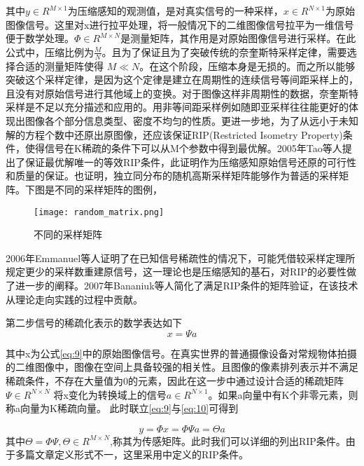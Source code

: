 其中$y \in R^{M \times 1}$为压缩感知的观测值，是对真实信号的一种采样，$x \in R^{N \times 1}$为原始图像信号。这里对x进行拉平处理，将一般情况下的二维图像信号拉平为一维信号便于数学处理。$\Phi \in R^{M \times N}$是测量矩阵，其作用是对原始图像信号进行采样。在此公式中，压缩比例为$\frac{M}{N}$。且为了保证且为了突破传统的奈奎斯特采样定律，需要选择合适的测量矩阵使得 $M \ll N$。在这个阶段，压缩本身是无损的。而之所以能够突破这个采样定律，是因为这个定律是建立在周期性的连续信号等间距采样上的，且没有对原始信号进行其他域上的变换。对于图像这样非周期性的数据，奈奎斯特采样是不足以充分描述和应用的。用非等间距采样例如随即亚采样往往能更好的体现出图像各个部分信息类型、密度不均匀的性质。更进一步地，为了从远小于未知解的方程个数中还原出原图像，还应该保证RIP(Restricted Isometry Property)条件，使得信号在K稀疏的条件下可以从M个参数中得到最优解。2005年Tao等人\cite{Decoding_by_linear_programming}提出了保证最优解唯一的等效RIP条件，此证明作为压缩感知原始信号还原的可行性和质量的保证。也证明，独立同分布的随机高斯采样矩阵能够作为普适的采样矩阵。下图是不同的采样矩阵的图例，

\begin{figure}[ht]
  \centering
  \texttt{[image: random\_matrix.png]}
  \label{fig:random_sample_matrix}
  \caption{不同的采样矩阵}
\end{figure}

2006年Emmanuel等人\cite{Emmanuel2006Stable}证明了在已知信号稀疏性的情况下，可能凭借较采样定理所规定更少的采样数重建原信号，这一理论也是压缩感知的基石，对RIP的必要性做了进一步的阐释。2007年Bananiuk等人\cite{2008A}简化了满足RIP条件的矩阵验证，在该技术从理论走向实践的过程中贡献。


第二步信号的稀疏化表示的数学表达如下
\begin{equation}
  \label{eq:10}
  x = \Psi a
\end{equation}

其中x为公式\ref{eq:9}中的原始图像信号。在真实世界的普通摄像设备对常规物体拍摄的二维图像中，图像在空间上具备较强的相关性。且图像的像素排列表示并不满足稀疏条件，不存在大量值为0的元素，因此在这一步中通过设计合适的稀疏矩阵$\Psi \in R^{N \times N}$
将x变化为转换域上的信号$a \in R^{N \times 1}$。如果a向量中有K个非零元素，则称a向量为K稀疏向量。
此时联立\ref{eq:9}与\ref{eq:10}可得到

\begin{equation}
  \label{eq:14}
   y = \Phi x = \Phi \Psi a = \Theta a
\end{equation}
其中$\Theta = \Phi \Psi, \Theta \in R^{M \times N}$,称其为传感矩阵。此时我们可以详细的列出RIP条件。由于多篇文章定义形式不一，这里采用\cite{The_restricted_isometry_property_and_its_implications_for_compressed_sensing}中定义的RIP条件。

